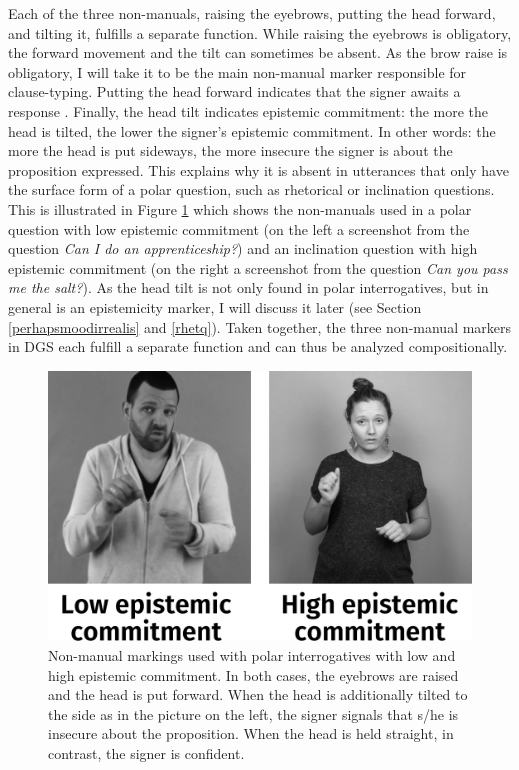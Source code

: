 Each of the three non-manuals, raising the eyebrows, putting the head forward, and tilting it, fulfills a separate function. While raising the eyebrows is obligatory, the forward movement and the tilt can sometimes be absent. As the brow raise is obligatory, I will take it to be the main non-manual marker responsible for clause-typing. Putting the head forward indicates that the signer awaits a response \citep[171--172]{papaspyrou2008grammatik}. Finally, the head tilt indicates epistemic commitment: the more the head is tilted, the lower the signer's epistemic commitment. In other words: the more the head is put sideways, the more insecure the signer is about the proposition expressed. This explains why it is absent in utterances that only have the surface form of a polar question, such as rhetorical or inclination questions. This is illustrated in Figure \ref{fig:epistemiccommitment} which shows the non-manuals used in a polar question with low epistemic commitment (on the left a screenshot from the question \textit{Can I do an apprenticeship?}) and an inclination question with high epistemic commitment (on the right a screenshot from the question \textit{Can you pass me the salt?}). As the head tilt is not only found in polar interrogatives, but in general is an epistemicity marker, I will discuss it later (see Section \ref{perhapsmoodirrealis} and \ref{rhetq}). Taken together, the three non-manual markers in DGS each fulfill a separate function and can thus be analyzed compositionally.

\begin{figure}[bt]
\centering
	\includegraphics[width=1.0\textwidth]{epistemiccommitmentsw.jpg}
	\caption{Non-manual markings used with polar interrogatives with low and high epistemic commitment. In both cases, the eyebrows are raised and the head is put forward. When the head is additionally tilted to the side as in the picture on the left, the signer signals that s/he is insecure about the proposition. When the head is held straight, in contrast, the signer is confident.}
		\label{fig:epistemiccommitment}
\end{figure}	

